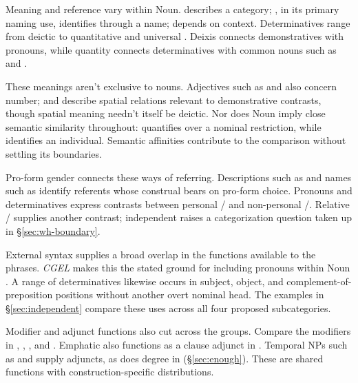 \documentclass[12pt]{article}
\begin{document}
Meaning and reference vary within Noun.  describes a category; , in its primary naming use, identifies through a name;  depends on context. Determinatives range from deictic  to quantitative  and universal  \citep[358--360, 370--405, 425--428, 515--521]{huddleston2002}. Deixis connects demonstratives with pronouns, while quantity connects determinatives with common nouns such as  and .

These meanings aren't exclusive to nouns. Adjectives such as  and  also concern number;  and  describe spatial relations relevant to demonstrative contrasts, though spatial meaning needn't itself be deictic. Nor does Noun imply close semantic similarity throughout:  quantifies over a nominal restriction, while  identifies an individual. Semantic affinities contribute to the comparison without settling its boundaries.

Pro-form gender \citep{reynolds2025proformgender} connects these ways of referring. Descriptions such as  and names such as  identify referents whose construal bears on pro-form choice. Pronouns and determinatives express contrasts between personal / and non-personal /. Relative / supplies another contrast; independent  raises a categorization question taken up in §\ref{sec:wh-boundary}.

External syntax supplies a broad overlap in the functions available to the phrases. \textit{CGEL} makes this the stated ground for including pronouns within Noun \citep[327]{huddleston2002}. A range of determinatives likewise occurs in subject, object, and complement-of-preposition positions without another overt nominal head. The examples in §\ref{sec:independent} compare these uses across all four proposed subcategories.

Modifier and adjunct functions also cut across the groups. Compare the modifiers in , , , and . Emphatic  also functions as a clause adjunct in  \citep[1496--1497]{huddleston2002}. Temporal NPs such as  and  supply adjuncts, as does degree  in  (§\ref{sec:enough}). These are shared functions with construction-specific distributions.
\end{document}
